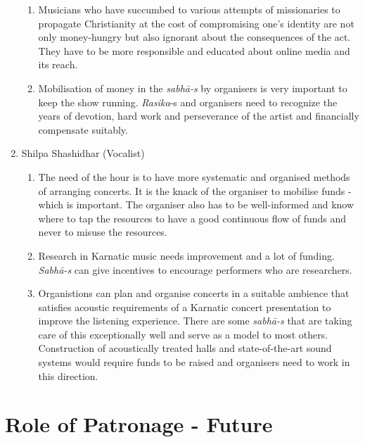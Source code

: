 \begin{enumerate}
\begin{enumerate}
 \item Musicians who have succumbed to various attempts of missionaries to propagate Christianity at the cost of compromising one’s identity are not only money-hungry but also ignorant about the consequences of the act. They have to be more responsible and educated about online media and its reach.

 \item Mobilisation of money in the \textit{sabhā-s} by organisers is very important to keep the show running. \textit{Rasika}-s and organisers need to recognize the years of devotion, hard work and perseverance of the artist and financially compensate suitably.
\end{enumerate}


 \item Shilpa Shashidhar (Vocalist)
 
\begin{enumerate}
\itemsep=0pt

 \item The need of the hour is to have more systematic and organised methods of arranging concerts. It is the knack of the organiser to mobilise funds - which is important. The organiser also has to be well-informed and know where to tap the resources to have a good continuous flow of funds and never to misuse the resources.

 \item Research in Karnatic music needs improvement and a lot of funding. \textit{Sabhā-s} can give incentives to encourage performers who are researchers.

 \item Organistions can plan and organise concerts in a suitable ambience that satisfies acoustic requirements of a Karnatic concert presentation to improve the listening experience. There are some \textit{sabhā-s} that are taking care of this exceptionally well and serve as a model to most others. Construction of acoustically treated halls and state-of-the-art sound systems would require funds to be raised and organisers need to work in this direction.
\end{enumerate}


\end{enumerate}

\vspace{-.6cm}

\section*{Role of Patronage - Future}

